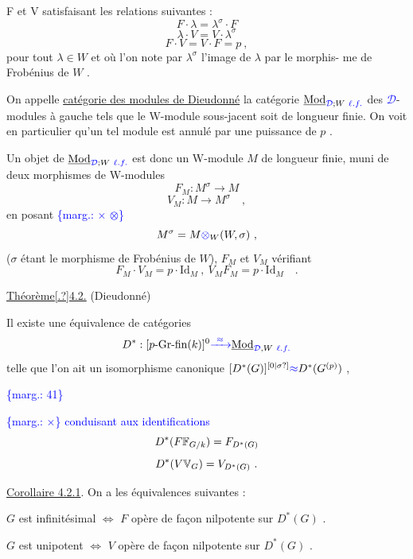 \documentclass[11pt]{article}
\newcommand{\scanpage}[1]{\par\bigskip\noindent{\small\sffamily[scan #1]}\par}
\newcommand{\mspage}[1]{{\small\sffamily[p.\,#1]}}
\newcommand{\hand}[1]{\textcolor{blue}{#1}}
\let\over\relax
\newcommand{\over}[2]{\textcolor{gray}{#1}\textcolor{blue}{\ensuremath{^{\!\nearrow}}#2}}
\newcommand{\margin}[1]{\textcolor{blue}{\{\textsf{marg.:} #1\}}}
\newcommand{\uline}[1]{\underline{#1}}
\newcommand{\unsure}[1]{[#1?]}
\begin{document}
F et V satisfaisant les relations suivantes :
\[ F\cdot\lambda = \lambda^{\sigma}\cdot F \]
\[ \lambda\cdot V = V\cdot\lambda^{\sigma} \]
\[ F\cdot V = V\cdot F = p \ , \]
pour tout $\lambda \in W$ et où l'on note par $\lambda^{\sigma}$ l'image de $\lambda$ par le morphis-%
me de Frobénius de $W$ .

On appelle \uline{catégorie des modules de Dieudonné} la catégorie
$\underline{\mathrm{Mod}}_{\hand{\mathcal{D}};W\ \hand{\ell.f.}}$ des \hand{$\mathcal{D}$}-modules à gauche tels que le W-module sous-jacent soit
de longueur finie. On voit en particulier qu'un tel module est annulé par
une puissance de $p$ .

Un objet de $\underline{\mathrm{Mod}}_{\hand{\mathcal{D}};W\ \hand{\ell.f.}}$ est donc un W-module $M$ de longueur
finie, muni de deux morphismes de W-modules
\[ F_M : M^{\sigma} \rightarrow M \]
\[ V_M : M \rightarrow M^{\sigma} \quad , \]
en posant
\margin{$\times$ \quad $\otimes$}
\[ M^{\sigma} = M \hand{\otimes}_W (W,\sigma) \ , \]
($\sigma$ étant le morphisme de Frobénius de $W$), $F_M$ et $V_M$ vérifiant
\[ F_M\cdot V_M = p\cdot \mathrm{Id}_M \ , \ V_M F_M = p\cdot \mathrm{Id}_M \quad . \]

\uline{Théorème\unsure{.}4.2.} (Dieudonné)

Il existe une équivalence de catégories
\[ D^* : [p\text{-}\mathrm{Gr}\text{-}\mathrm{fin}(k)]^{0} \hand{\xrightarrow{\ \approx\ }} \underline{\mathrm{Mod}}_{\hand{\mathcal{D}},W\ \hand{\ell.f.}} \]
telle que l'on ait un isomorphisme canonique $[D^*(G)]^{\unsure{0|\sigma}} \hand{\approx} D^*(G^{(p)})$ ,

\margin{41}

\clearpage
\scanpage{129/42}
\mspage{II.14}

\margin{$\times$} \hand{conduisant aux identifications}
\[ D^*(\over{F}{\mathbb{F}}_{G/k}) = F_{D^*(G)} \]
\[ D^*(\over{V}{\mathbb{V}}_G) = V_{D^*(G)} \ . \]

\uline{Corollaire 4.2.1}. On a les équivalences suivantes :

$G$ est infinitésimal $\Longleftrightarrow$ $F$ opère de façon nilpotente sur $D^*(G)$ .

$G$ est unipotent $\Longleftrightarrow$ $V$ opère de façon nilpotente sur $D^*(G)$ .
\end{document}
